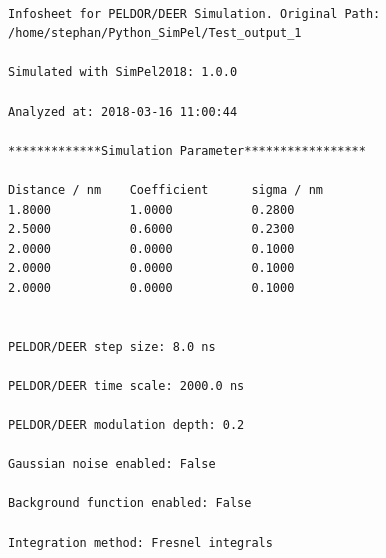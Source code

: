 \documentclass[pdftex,bezier,german,a4,twoside, headexclude,12pt,nochapterprefix, titlepage]{extarticle}
\begin{document}
\newpage
\begin{lstlisting}[caption={Example for an automatically aved information sheet.},label = Information_sheet]

Infosheet for PELDOR/DEER Simulation. Original Path:
/home/stephan/Python_SimPel/Test_output_1

Simulated with SimPel2018: 1.0.0

Analyzed at: 2018-03-16 11:00:44

*************Simulation Parameter*****************

Distance / nm 	 Coefficient	  sigma / nm
1.8000	         1.0000	          0.2800	         
2.5000	         0.6000	          0.2300	         
2.0000	         0.0000	          0.1000	         
2.0000	         0.0000	          0.1000	         
2.0000	         0.0000	          0.1000	         


PELDOR/DEER step size: 8.0 ns

PELDOR/DEER time scale: 2000.0 ns

PELDOR/DEER modulation depth: 0.2

Gaussian noise enabled: False

Background function enabled: False

Integration method: Fresnel integrals
\end{lstlisting}



\newpage
\FloatBarrier
\end{document}
